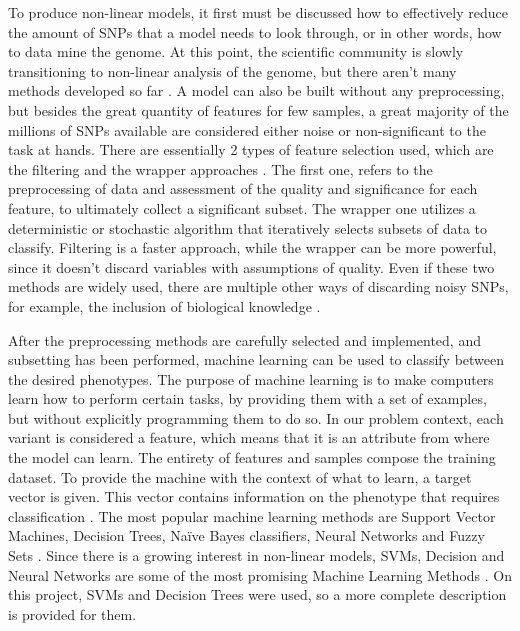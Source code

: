 To produce non-linear models, it first must be discussed how to effectively reduce the amount of SNPs that a model needs to look through, or in other words, how to data mine the genome. At this point, the scientific community is slowly transitioning to non-linear analysis of the genome, but there aren't many methods developed so far \cite{marjoram2014post}. A model can also be built without any preprocessing, but besides the great quantity of features for few samples, a great majority of the millions of SNPs available are considered either noise or non-significant to the task at hands. There are essentially 2 types of feature selection used, which are the filtering and the wrapper approaches \cite{moore2010bioinformatics}. The first one, refers to the preprocessing of data and assessment of the quality and significance for each feature, to ultimately collect a significant subset. The wrapper one utilizes a deterministic or stochastic algorithm that iteratively selects subsets of data to classify. Filtering is a faster approach, while the wrapper can be more powerful, since it doesn't discard variables with assumptions of quality. Even if these two methods are widely used, there are multiple other ways of discarding noisy \gls{SNP}s, for example, the inclusion of biological knowledge \cite{xu2009snpinfo}. 

After the preprocessing methods are carefully selected and implemented, and subsetting has been performed, machine learning can be used to classify between the desired phenotypes. The purpose of machine learning is to make computers learn how to perform certain tasks, by providing them with a set of examples, but without explicitly programming them to do so. In our problem context, each variant is considered a feature, which means that it is an attribute from where the model can learn. The entirety of features and samples compose the training dataset. To provide the machine with the context of what to learn, a target vector is given. This vector contains information on the phenotype that requires classification \cite{nelson2013higher}. The most popular machine learning methods are Support Vector Machines, Decision Trees, Naïve Bayes classifiers, Neural Networks and Fuzzy Sets \cite{szymczak2009machine}. Since there is a growing interest in non-linear models, \gls{SVM}s, Decision and Neural Networks are some of the most promising Machine Learning Methods \cite{kavakiotis2017machine}. On this project, \gls{SVM}s and Decision Trees were used, so a more complete description is provided for them.

